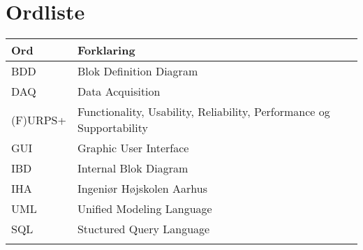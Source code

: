 \chapter{Ordliste}

\begin{longtabu} to 
    Ord &    Forklaring\\
    \toprule 
    BDD & Blok Definition Diagram \\	    
    DAQ & Data Acquisition\\
    (F)URPS+ & Functionality, Usability, Reliability, Performance og Supportability\\
	GUI & Graphic User Interface\\
	IBD & Internal Blok Diagram\\
	IHA & Ingeniør Højskolen Aarhus\\
	UML & Unified Modeling Language\\
	SQL & Stuctured Query Language\\
	
\label{forkort}
\end{longtabu}